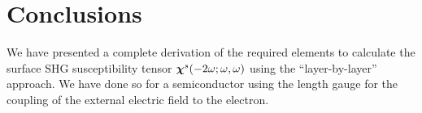 \documentclass[floatfix,prb,aps,superscriptaddress,11pt,preprint]{revtex4}
\begin{document}
\section{Conclusions}\label{con}

We have presented a complete derivation of the required elements to
calculate the surface SHG susceptibility tensor $\boldsymbol{\chi}^s(-2\omega;\omega,\omega)$ 
using the ``layer-by-layer'' approach. We have done so for a
semiconductor using the 
length gauge for the coupling of the external electric field to the electron. 

\appendix
%
%
%
%
%
%

%

\end{document}
